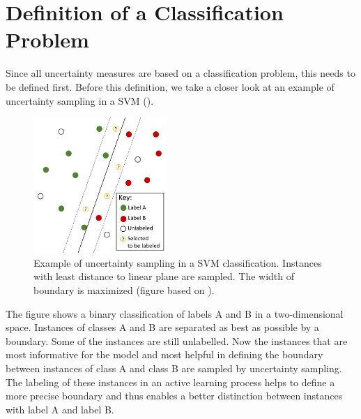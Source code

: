 \section{Definition of a Classification Problem}
\label{sec:definition_of_a_classification_problem}
%
Since all uncertainty measures are based on a classification problem, this needs to be defined first.
Before this definition, we take a closer look at an example of uncertainty sampling in a \ac{SVM} ().
\begin{figure}[H]
  \centering
    \includegraphics[width=0.45\textwidth]{figures/SVM.pdf}
  \caption{Example of uncertainty sampling in a \ac{SVM} classification. Instances with least distance to linear plane are sampled.
  The width of boundary is maximized  (figure based on \cite{human-in-the-loop}).}
  \label{fig:svm}
\end{figure}
The figure shows a binary classification of labels A and B in a two-dimensional space.
Instances of classes A and B are separated as best as possible by a boundary.
Some of the instances are still unlabelled.
Now the instances that are most informative for the model and most helpful in defining the boundary between instances of class A and class B are sampled by uncertainty sampling.
The labeling of these instances in an active learning process helps to define a more precise boundary and thus enables a better distinction between instances with label A and label B.

